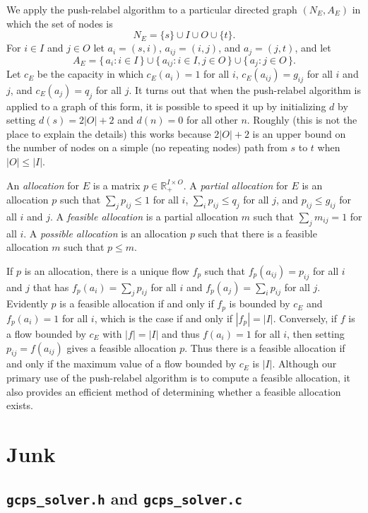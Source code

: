 \documentclass[12pt]{article}
\theoremstyle{definition}
\renewcommand{\Re}{\mathbb{R}}
\begin{document}
\begin{appendix}
We apply the push-relabel algorithm to a particular directed graph
$(N_E,A_E)$ in which the set of nodes is $$N_E = \{s\} \cup I \cup O
\cup \{t\}.$$ For $i \in I$ and $j \in O$ let $a_i = (s,i)$, $a_{ij} =
(i,j)$, and $a_j = (j,t)$, and let
$$A_E = \{\, a_i : i \in I \,\} \cup \{\, a_{ij} : i \in I, j \in O
\,\} \cup \{\, a_j : j \in O \,\}.$$ Let $c_E$ be the capacity in
which $c_E(a_i) = 1$ for all $i$, $c_E(a_{ij}) = g_{ij}$ for all $i$
and $j$, and $c_E(a_j) = q_j$ for all $j$.  It turns out that when the
push-relabel algorithm is applied to a graph of this form, it is
possible to speed it up by initializing $d$ by setting $d(s) = 2|O| +
2$ and $d(n) = 0$ for all other $n$.  Roughly (this is not the place
to explain the details) this works because $2|O| + 2$ is an upper
bound on the number of nodes on a simple (no repeating nodes) path
from $s$ to $t$ when $|O| \le |I|$.

An \emph{allocation} for $E$ is a matrix $p \in \Re_+^{I \times O}$.
A \emph{partial allocation} for $E$ is an allocation $p$ such that
$\sum_j p_{ij} \le 1$ for all $i$, $\sum_i p_{ij} \le q_j$ for all
$j$, and $p_{ij} \le g_{ij}$ for all $i$ and $j$. A \emph{feasible
allocation} is a partial allocation $m$ such that $\sum_j m_{ij} =
1$ for all $i$.  A \emph{possible allocation} is an allocation $p$
such that there is a feasible allocation $m$ such that $p \le m$.  

If $p$ is an allocation, there is a unique flow $f_p$ such that
$f_p(a_{ij}) = p_{ij}$ for all $i$ and $j$ that has $f_p(a_i) = \sum_j
p_{ij}$ for all $i$ and $f_p(a_j) = \sum_i p_{ij}$ for all
$j$. Evidently $p$ is a feasible allocation if and only if $f_p$ is
bounded by $c_E$ and $f_p(a_i) = 1$ for all $i$, which is the case if
and only if $|f_p| = |I|$.  Conversely, if $f$ is a flow bounded by
$c_E$ with $|f| = |I|$ and thus $f(a_i) = 1$ for all $i$, then setting
$p_{ij} = f(a_{ij})$ gives a feasible allocation $p$.  Thus there is a
feasible allocation if and only if the maximum value of a flow bounded
by $c_E$ is $|I|$.  Although our primary use of the push-relabel
algorithm is to compute a feasible allocation, it also provides an
efficient method of determining whether a feasible allocation exists.

\section{Junk}

\subsection{\texttt{gcps\_solver.h} and \texttt{gcps\_solver.c}}
\label{subsec:Solver}


\end{appendix}
\end{document}
